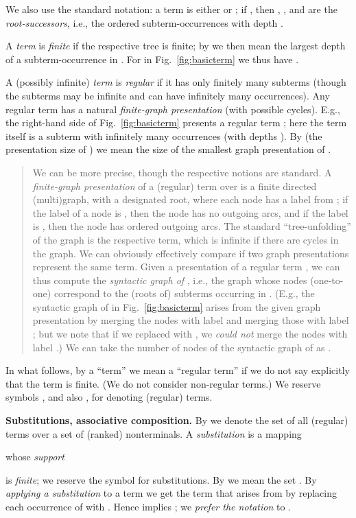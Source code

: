 \documentclass{llncs}
\begin{document}
We also use the standard notation: a term is either  or
; if , then 
, , and
 are the \emph{root-successors}, i.e.,
the ordered subterm-occurrences with depth .

A \emph{term}  is \emph{finite} if the respective tree is finite; by
 we then mean the largest depth of a subterm-occurrence in . 
For 
in Fig.~\ref{fig:basicterm}
we thus have .

A (possibly infinite) \emph{term} is \emph{regular}
if it has only finitely many subterms (though the subterms may be infinite and
can have infinitely many occurrences). 
Any regular term has a natural \emph{finite-graph
presentation} (with possible cycles).
E.g., the right-hand side of Fig.~\ref{fig:basicterm} presents a
regular term ; here the term  itself is a subterm 
with infinitely many
occurrences (with depths ).
By  (the presentation 
size of
) we mean the size
of the smallest graph presentation of .

\begin{quote}
{\small
We can be more precise, though the respective notions are standard.
A \emph{finite-graph
presentation} of a (regular) term over  is a finite directed
(multi)graph, 
with a designated root,
where each node has a
label from ; if the label of a node is ,
then the node has no outgoing arcs, and if the label is  ,
then the node has  ordered outgoing arcs. 
The standard ``tree-unfolding'' of the graph is the respective term, 
which is infinite if there are cycles in the graph.
We can obviously effectively
compare if two graph presentations
represent the same term.
Given a presentation of a regular term , we can thus 
compute the \emph{syntactic graph of} , i.e., 
the graph whose nodes
(one-to-one) correspond to the (roots of) subterms occurring in .
(E.g., the syntactic graph of  in Fig.~\ref{fig:basicterm} arises from
the given graph presentation by merging the nodes with label 
and merging those with label ; but we note that if we replaced  with , we
\emph{could not} merge the nodes with label .)
We can take the number of nodes
of the syntactic graph of  as .
}
\end{quote}
In what follows, by a ``term'' we mean a ``regular term''
if we do not say explicitly that the term is finite.
(We do not consider non-regular terms.)
We reserve symbols , and also , for denoting
(regular) terms. 

\textbf{Substitutions, associative composition.}
By  we denote the set of all (regular) terms over
a set  of (ranked) nonterminals.
A \emph{substitution}  is a mapping
\begin{center}
 whose 
\emph{support}

\end{center}
is \emph{finite};
we reserve the symbol  for substitutions.
By  we mean the set .
By \emph{applying a substitution}  {to 
a term}  we get the term  
that arises from  by replacing each occurrence of  with
.
Hence  implies
; we \emph{prefer the
notation}
 to .
\end{document}
